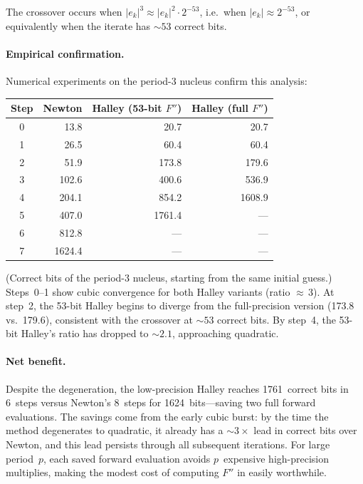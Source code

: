 The crossover occurs when $|e_k|^3 \approx |e_k|^2 \cdot 2^{-53}$,
i.e.\ when $|e_k| \approx 2^{-53}$, or equivalently when the iterate has
${\sim}53$ correct bits.

\paragraph{Empirical confirmation.}
Numerical experiments on the period-3 nucleus confirm this analysis:

\begin{center}
\begin{tabular}{crrr}
\hline
\textbf{Step} & \textbf{Newton} & \textbf{Halley (53-bit $F''$)}
              & \textbf{Halley (full $F''$)} \\
\hline
0 &  13.8 &  20.7 &  20.7 \\
1 &  26.5 &  60.4 &  60.4 \\
2 &  51.9 & 173.8 & 179.6 \\
3 & 102.6 & 400.6 & 536.9 \\
4 & 204.1 & 854.2 & 1608.9 \\
5 & 407.0 & 1761.4 & --- \\
6 & 812.8 & --- & --- \\
7 & 1624.4 & --- & --- \\
\hline
\end{tabular}
\end{center}

(Correct bits of the period-3 nucleus, starting from the same initial guess.)
Steps~0--1 show cubic convergence for both Halley variants (ratio
${\approx}\,3$). At step~2, the 53-bit Halley begins to diverge from the
full-precision version (173.8 vs.\ 179.6), consistent with the crossover at
${\sim}53$ correct bits.  By step~4, the 53-bit Halley's ratio has dropped to
${\sim}2.1$, approaching quadratic.

\paragraph{Net benefit.}
Despite the degeneration, the low-precision Halley reaches 1761~correct bits
in 6~steps versus Newton's 8~steps for 1624~bits---saving two full forward
evaluations.  The savings come from the early cubic burst: by the time the
method degenerates to quadratic, it already has a ${\sim}3\times$ lead in
correct bits over Newton, and this lead persists through all subsequent
iterations.  For large period~$p$, each saved forward evaluation avoids
$p$~expensive high-precision multiplies, making the modest cost of computing
$F''$ in  easily worthwhile.

